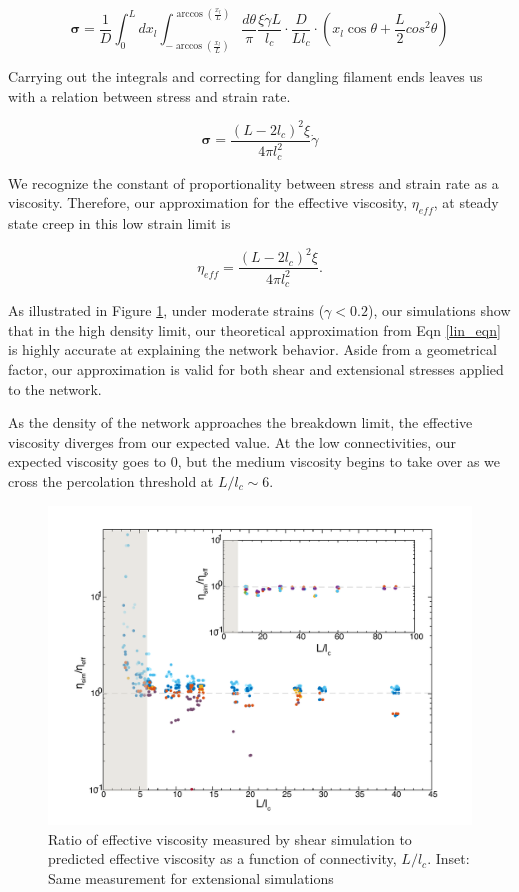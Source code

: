 \documentclass[pre,preprint]{revtex4-1}
\begin{document}
\begin{equation}
\mathbf{\sigma} =  \frac{1}{D} \int_0^L dx_l \int_{-\arccos (\frac{x_l}{L})}^{\arccos (\frac{x_l}{L})}\frac{d\theta}{\pi} \frac{\xi \dot \gamma L}{l_c} \cdot \frac{D}{Ll_c}\cdot (x_l \cos \theta + \frac{L}{2} cos^2\theta)
\end{equation}

Carrying out the integrals and correcting for dangling filament ends leaves us with a relation between stress and strain rate.

\begin{equation}
\mathbf{\sigma} = \frac{(L-2l_c)^2 \xi}{4\pi l_c^2} \dot \gamma 
\end{equation}

We recognize the constant of proportionality between stress and strain rate as a viscosity.  Therefore, our approximation for the effective viscosity, $\eta_{eff}$, at steady state creep in this low strain limit is

\begin{equation}
\label{lin_eqn}
\eta_{eff} = \frac{(L-2l_c)^2 \xi}{4\pi l_c^2} .
\end{equation}

As illustrated in Figure \ref{fig:effvic}, under moderate strains ($\gamma<0.2$), our  simulations show that in the high density limit, our theoretical approximation from Eqn \ref{lin_eqn} is highly accurate at explaining the network behavior.  Aside from a geometrical factor, our approximation is valid for both shear and extensional stresses applied to the network.

As the density of the network approaches the breakdown limit, the effective viscosity diverges from our expected value.  At the low connectivities, our expected viscosity goes to 0, but the medium viscosity begins to take over as we cross the percolation threshold at $L/l_c \sim 6$.  
\begin{figure}[h!]
\centering
\includegraphics[width=\hsize]{eff_vic_master}
\caption{\label{fig:effvic}Ratio of effective viscosity measured by shear simulation to predicted effective viscosity as a function of connectivity, $L/l_c$. Inset: Same measurement for extensional simulations }
\end{figure}
\end{document}
